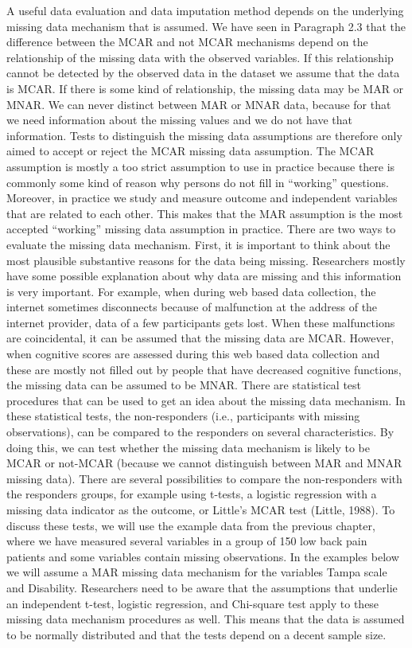 \documentclass[]{book}
\theoremstyle{definition}
\theoremstyle{definition}
\theoremstyle{definition}
\theoremstyle{remark}
\begin{document}
A useful data evaluation and data imputation method depends on the
underlying missing data mechanism that is assumed. We have seen in
Paragraph 2.3 that the difference between the MCAR and not MCAR
mechanisms depend on the relationship of the missing data with the
observed variables. If this relationship cannot be detected by the
observed data in the dataset we assume that the data is MCAR. If there
is some kind of relationship, the missing data may be MAR or MNAR. We
can never distinct between MAR or MNAR data, because for that we need
information about the missing values and we do not have that
information. Tests to distinguish the missing data assumptions are
therefore only aimed to accept or reject the MCAR missing data
assumption. The MCAR assumption is mostly a too strict assumption to use
in practice because there is commonly some kind of reason why persons do
not fill in ``working'' questions. Moreover, in practice we study and
measure outcome and independent variables that are related to each
other. This makes that the MAR assumption is the most accepted
``working'' missing data assumption in practice. There are two ways to
evaluate the missing data mechanism. First, it is important to think
about the most plausible substantive reasons for the data being missing.
Researchers mostly have some possible explanation about why data are
missing and this information is very important. For example, when during
web based data collection, the internet sometimes disconnects because of
malfunction at the address of the internet provider, data of a few
participants gets lost. When these malfunctions are coincidental, it can
be assumed that the missing data are MCAR. However, when cognitive
scores are assessed during this web based data collection and these are
mostly not filled out by people that have decreased cognitive functions,
the missing data can be assumed to be MNAR. There are statistical test
procedures that can be used to get an idea about the missing data
mechanism. In these statistical tests, the non-responders (i.e.,
participants with missing observations), can be compared to the
responders on several characteristics. By doing this, we can test
whether the missing data mechanism is likely to be MCAR or not-MCAR
(because we cannot distinguish between MAR and MNAR missing data). There
are several possibilities to compare the non-responders with the
responders groups, for example using t-tests, a logistic regression with
a missing data indicator as the outcome, or Little's MCAR test (Little,
1988). To discuss these tests, we will use the example data from the
previous chapter, where we have measured several variables in a group of
150 low back pain patients and some variables contain missing
observations. In the examples below we will assume a MAR missing data
mechanism for the variables Tampa scale and Disability. Researchers need
to be aware that the assumptions that underlie an independent t-test,
logistic regression, and Chi-square test apply to these missing data
mechanism procedures as well. This means that the data is assumed to be
normally distributed and that the tests depend on a decent sample size.
\end{document}

